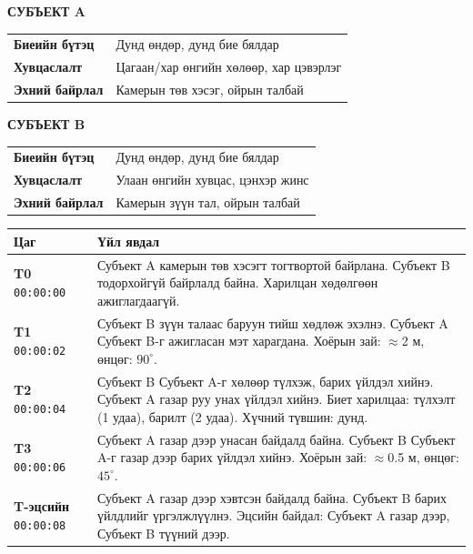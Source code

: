 \begin{tcolorbox}[tab2, title={Субъектүүдийн тодорхойлолт}]
\small
\textbf{СУБЪЕКТ A} \\[4pt]
\begin{tabular}{@{}ll}
\textbf{Биеийн бүтэц}    & Дунд өндөр, дунд бие бялдар \\
\textbf{Хувцаслалт}      & Цагаан/хар өнгийн хөлөөр, хар цэвэрлэг \\
\textbf{Эхний байрлал}   & Камерын төв хэсэг, ойрын талбай \\
\end{tabular}

\vspace{6pt}
\textbf{СУБЪЕКТ B} \\[4pt]
\begin{tabular}{@{}ll}
\textbf{Биеийн бүтэц}    & Дунд өндөр, дунд бие бялдар \\
\textbf{Хувцаслалт}      & Улаан өнгийн хувцас, цэнхэр жинс \\
\textbf{Эхний байрлал}   & Камерын зүүн тал, ойрын талбай \\
\end{tabular}
\end{tcolorbox}

\vspace{4pt}

\begin{tcolorbox}[tab2, title={Үйл явдлын цагийн дараалал}]
\small
\begin{tabularx}{\linewidth}{@{}lX@{}}
\hline
\textbf{Цаг} & \textbf{Үйл явдал} \\
\hline
\textbf{T0} \newline \texttt{00:00:00} &
  Субъект A камерын төв хэсэгт тогтвортой байрлана.
  Субъект B тодорхойгүй байрлалд байна.
  Харилцан хөдөлгөөн ажиглагдаагүй. \\[4pt]
\textbf{T1} \newline \texttt{00:00:02} &
  Субъект B зүүн талаас баруун тийш хөдлөж эхэлнэ.
  Субъект A Субъект B-г ажигласан мэт харагдана.
  Хоёрын зай: $\approx$2 м, өнцөг: $90^\circ$. \\[4pt]
\textbf{T2} \newline \texttt{00:00:04} &
  Субъект B Субъект A-г хөлөөр түлхэж, барих үйлдэл хийнэ.
  Субъект A газар руу унах үйлдэл хийнэ.
  Биет харилцаа: түлхэлт (1 удаа), барилт (2 удаа).
  Хүчний түвшин: дунд. \\[4pt]
\textbf{T3} \newline \texttt{00:00:06} &
  Субъект A газар дээр унасан байдалд байна.
  Субъект B Субъект A-г газар дээр барих үйлдэл хийнэ.
  Хоёрын зай: $\approx$0.5 м, өнцөг: $45^\circ$. \\[4pt]
\textbf{T-эцсийн} \newline \texttt{00:00:08} &
  Субъект A газар дээр хэвтсэн байдалд байна.
  Субъект B барих үйлдлийг үргэлжлүүлнэ.
  Эцсийн байдал: Субъект A газар дээр, Субъект B түүний дээр. \\
\hline
\end{tabularx}
\end{tcolorbox}

